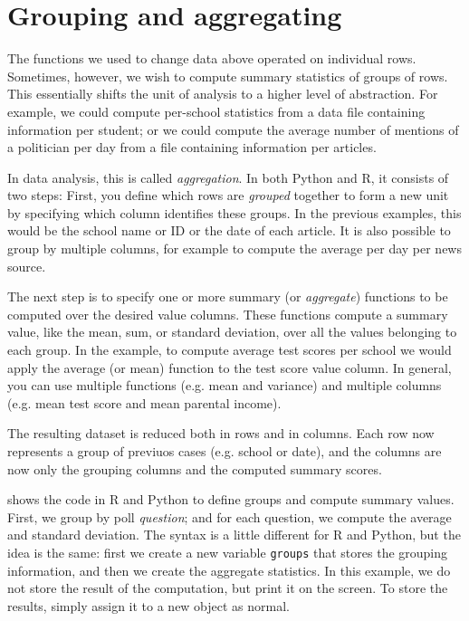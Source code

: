 \section{Grouping and aggregating}

The functions we used to change data above operated on individual rows.
Sometimes, however, we wish to compute summary statistics of groups of rows.
This essentially shifts the unit of analysis to a higher level of abstraction.
For example, we could compute per-school statistics from a data file containing information per student;
or we could compute the average number of mentions of a politician per day from a file containing information per articles.

In data analysis, this is called \emph{aggregation}.
In both Python and R, it consists of two steps:
First, you define which rows are \emph{grouped} together to form a new unit
by specifying which column identifies these groups.
In the previous examples, this would be the school name or ID or the date of each article.
It is also possible to group by multiple columns, for example to compute the average per day per news source.

The next step is to specify one or more summary (or \emph{aggregate}) functions to be computed over the desired value columns.
These functions compute a summary value, like the mean, sum, or standard deviation, over all the values belonging to each group.
In the example, to compute average test scores per school we would apply the average (or mean) function to the test score value column.
In general, you can use multiple functions (e.g.  mean and variance) and multiple columns (e.g. mean test score and mean parental income).

The resulting dataset is reduced both in rows and in columns.
Each row now represents a group of previuos cases (e.g. school or date),
and the columns are now only the grouping columns and the computed summary scores.

 shows the code in R and Python to define groups and compute summary values.
First, we group by poll \emph{question}; and for each question, we compute the average and standard deviation.
The syntax is a little different for R and Python, but the idea is the same:
first we create a new variable \verb+groups+ that stores the grouping information,
and then we create the aggregate statistics.
In this example, we do not store the result of the computation, but print it on the screen.
To store the results, simply assign it to a new object as normal.

